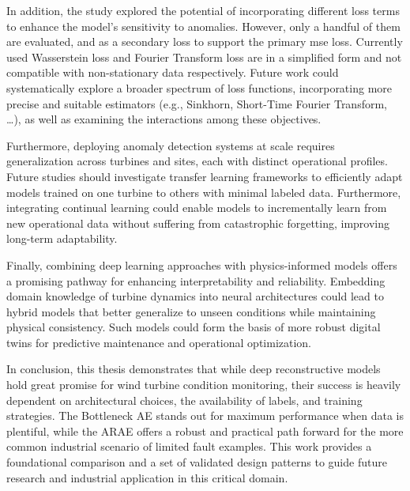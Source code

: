 In addition, the study explored the potential of incorporating different loss terms to enhance the model's sensitivity to anomalies.
However, only a handful of them are evaluated, and as a secondary loss to support the primary \gls{mse} loss. 
Currently used Wasserstein loss and Fourier Transform loss are in a simplified form and not compatible with non-stationary data respectively.
Future work could systematically explore a broader spectrum of loss functions, incorporating more precise and suitable estimators (e.g., Sinkhorn, Short-Time Fourier Transform, \dots), as well as examining the interactions among these objectives.

Furthermore, deploying anomaly detection systems at scale requires generalization across turbines and sites, each with distinct operational profiles. 
Future studies should investigate transfer learning frameworks to efficiently adapt models trained on one turbine to others with minimal labeled data. 
Furthermore, integrating continual learning could enable models to incrementally learn from new operational data without suffering from catastrophic forgetting, improving long-term adaptability.

Finally, combining deep learning approaches with physics-informed models offers a promising pathway for enhancing interpretability and reliability. 
Embedding domain knowledge of turbine dynamics into neural architectures could lead to hybrid models that better generalize to unseen conditions while maintaining physical consistency. 
Such models could form the basis of more robust digital twins for predictive maintenance and operational optimization.

In conclusion, this thesis demonstrates that while deep reconstructive models hold great promise for wind turbine condition monitoring, their success is heavily dependent on architectural choices, the availability of labels, and training strategies.
The Bottleneck AE stands out for maximum performance when data is plentiful, while the ARAE offers a robust and practical path forward for the more common industrial scenario of limited fault examples.
This work provides a foundational comparison and a set of validated design patterns to guide future research and industrial application in this critical domain.

